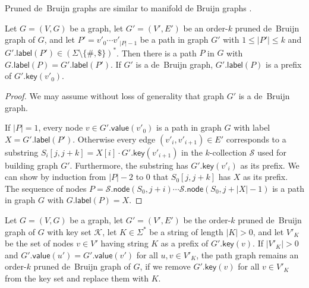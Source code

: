 \documentclass[a4paper,UKenglish]{lipics-v2016}
\newcommand{\set}[1]{\ensuremath{\{ #1 \}}}
\newcommand{\abs}[1]{\ensuremath{\lvert #1 \rvert}}
\newcommand{\glabel}{\ensuremath{\mathsf{label}}}
\newcommand{\gkey}{\ensuremath{\mathsf{key}}}
\newcommand{\gvalue}{\ensuremath{\mathsf{value}}}
\newcommand{\gnode}{\ensuremath{\mathsf{node}}}
\newcommand{\kcollection}[1]{$#1$\nobreakdash-collection}
\newcommand{\orderk}[1]{order\nobreakdash-$#1$}
\begin{document}
Pruned de~Bruijn graphs are similar to manifold de Bruijn graphs \cite{Lin2014}.

\begin{lemma}\label{lemma:dbg-fp}
Let $G = (V, G)$ be a graph, let $G' = (V', E')$ be an \orderk{k} pruned de~Bruijn graph of $G$, and let $P' = v'_{0} \dotsm v'_{\abs{P}-1}$ be a path in graph $G'$ with $1 \le \abs{P'} \le k$ and $G'.\glabel(P') \in (\Sigma \setminus \set{\#, \$})^{\ast}$. Then there is a path $P$ in $G$ with $G.\glabel(P) = G'.\glabel(P')$. If $G'$ is a de~Bruijn graph, $G'.\glabel(P)$ is a prefix of $G'.\gkey(v'_{0})$.
\end{lemma}

\begin{proof}
We may assume without loss of generality that graph $G'$ is a de~Bruijn graph.

If $\abs{P} = 1$, every node $v \in G'.\gvalue(v'_{0})$ is a path in graph $G$ with label $X = G'.\glabel(P')$.
Otherwise every edge $(v'_{i}, v'_{i+1}) \in E'$ corresponds to a substring $S_{i}[j, j+k] = X[i] \cdot G'.\gkey(v'_{i+1})$ in the \kcollection{k} $\mathcal{S}$ used for building graph $G'$. Furthermore, the substring has $G'.\gkey(v'_{i})$ as its prefix. We can show by induction from $\abs{P}-2$ to $0$ that $S_{0}[j, j+k]$ has $X$ as its prefix. The sequence of nodes $P = \mathcal{S}.\gnode(S_{0}, j+i) \dotsm \mathcal{S}.\gnode(S_{0}, j+\abs{X}-1)$ is a path in graph $G$ with $G.\glabel(P) = X$.
\end{proof}

\begin{lemma}\label{lemma:dbg-prune}
Let $G = (V, G)$ be a graph, let $G' = (V', E')$ be the \orderk{k} pruned de~Bruijn graph of $G$ with key set $\mathcal{K}$, let $K \in \Sigma^{\ast}$ be a string of length $\abs{K} > 0$, and let $V'_{K}$ be the set of nodes $v \in V'$ having string $K$ as a prefix of $G'.\gkey(v)$. If $\abs{V'_{K}} > 0$ and $G'.\gvalue(u') = G'.\gvalue(v')$ for all $u, v \in V'_{K}$, the path graph remains an \orderk{k} pruned de~Bruijn graph of $G$, if we remove $G'.\gkey(v)$ for all $v \in V'_{K}$ from the key set and replace them with $K$.
\end{lemma}
\end{document}
